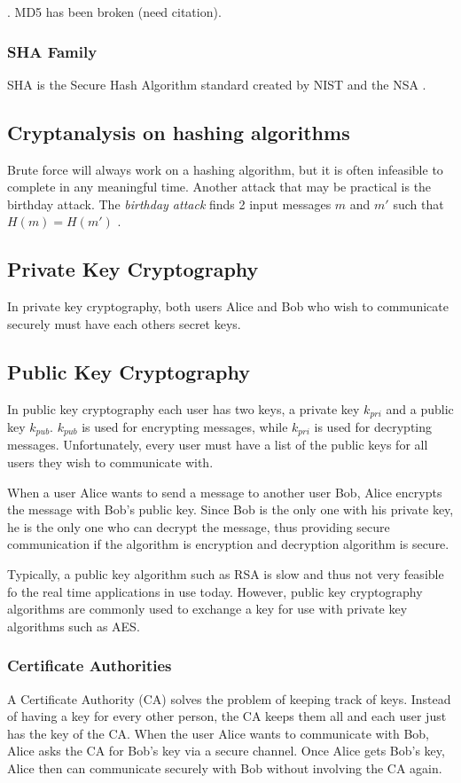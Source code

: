 \documentclass[12pt]{article}
\begin{document}
\cite[p. 436]{appcrypt}. MD5 has been broken (need citation).
\subsubsection{SHA Family}
SHA is the Secure Hash Algorithm standard created by NIST and the NSA \cite{appcrypt}.
\subsection{Cryptanalysis on hashing algorithms}
Brute force will always work on a hashing algorithm, but it is often infeasible to complete in any meaningful time. Another attack that may be practical is the birthday attack. The \textit{birthday attack} finds 2 input messages $m$ and $m'$ such that $H(m)=H(m')$ \cite{appcrypt}.
\subsection{Private Key Cryptography}
In private key cryptography, both users Alice and Bob who wish to communicate securely must have each others secret keys.
\subsection{Public Key Cryptography}
In public key cryptography each user has two keys, a private key $k_{pri}$ and a public key $k_{pub}$. $k_{pub}$ is used for encrypting messages, while $k_{pri}$ is used for decrypting messages. Unfortunately, every user must have a list of the public keys for all users they wish to communicate with.

When a user Alice wants to send a message to another user Bob, Alice encrypts the message with Bob's public key. Since Bob is the only one with his private key, he is the only one who can decrypt the message, thus providing secure communication if the algorithm is encryption and decryption algorithm is secure.

Typically, a public key algorithm such as RSA is slow and thus not very feasible fo the real time applications in use today. However, public key cryptography algorithms are commonly used to exchange a key for use with private key algorithms such as AES.

\subsubsection{Certificate Authorities}
A Certificate Authority (CA) solves the problem of keeping track of keys. Instead of having a key for every other person, the CA keeps them all and each user just has the key of the CA. When the user Alice wants to communicate with Bob, Alice asks the CA for Bob's key via a secure channel. Once Alice gets Bob's key, Alice then can communicate securely with Bob without involving the CA again.
\end{document}
